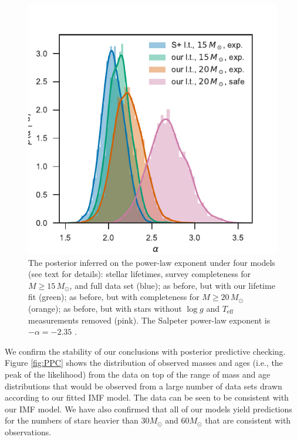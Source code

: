 \documentclass[apjl]{emulateapj}
\newcommand{\MSun}{M_\odot}
\begin{document}
\begin{figure}
    		    		\includegraphics[width=\columnwidth]{alpha.pdf}
    		\caption{The posterior inferred on the power-law exponent under four models (see text for details): \citet{Schneider:2018} stellar lifetimes, survey completeness for $M \geq 15 \, \MSun$, and full \citet{Schneider:2018} data set (blue); as before, but with our lifetime fit (green); as before, but with completeness for $M \geq 20 \, \MSun$ (orange); as before, but with stars without $\log g$ and $T_\textrm{eff}$ measurements removed (pink).  The Salpeter power-law exponent is $-\alpha=-2.35$ \citep{Salpeter:1955}. }\label{fig:IMF}
\end{figure}

We confirm the stability of our conclusions with posterior predictive checking.
Figure \ref{fig:PPC} shows the distribution of observed masses and ages (i.e.,
the peak of the likelihood) from the \citet{Schneider:2018} data on top of the
range of mass and age distributions that would be observed from a large number
of data sets drawn according to our fitted IMF model.  The data can be seen to
be consistent with our IMF model.  We have also confirmed that all of our models yield predictions for the numbers of stars heavier than $30 M_\odot$ and $60 M_\odot$ that are consistent with observations.
\end{document}
